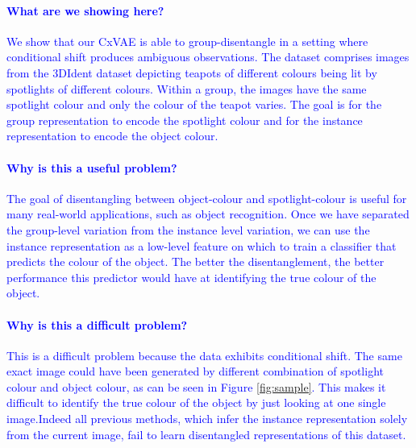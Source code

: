 \documentclass{article} %
\newcommand{\change}[1]{\textcolor{blue}{#1}}
\begin{document}
\change{\paragraph{What are we showing here?} We show that our CxVAE is able to group-disentangle in a setting where conditional shift produces ambiguous observations. The dataset comprises images from the 3DIdent dataset \citep{Zimmerman2021Contrastive} depicting teapots of different colours being lit by spotlights of different colours. Within a group, the images have the same spotlight colour and only the colour of the teapot varies.  The goal is for the group representation to encode the spotlight colour and for the instance representation to encode the object colour. }

\change{\paragraph{Why is this a useful problem?}The goal of disentangling between object-colour and spotlight-colour is useful for many real-world applications, such as object recognition. Once we have separated the group-level variation from the instance level variation, we can use the instance representation as a low-level feature on which to train a classifier that predicts the colour of the object. The better the disentanglement, the better performance this predictor would have at identifying the true colour of the object.}


\change{\paragraph{Why is this a difficult problem?} This is a difficult problem because the data exhibits conditional shift.  The same exact image could have been generated by different combination of spotlight colour and object colour, as can be seen in Figure \ref{fig:sample}.  This makes it difficult to identify the true colour of the object by just looking at one single image.Indeed all previous methods, which infer the instance representation solely from the current image, fail to learn disentangled representations of this dataset.}
\end{document}
